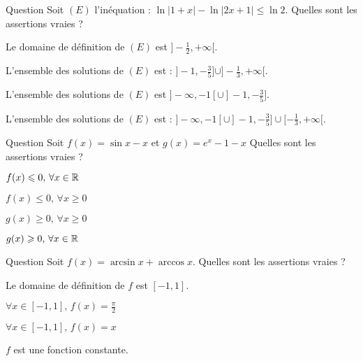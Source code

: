 \begin{multi}[multiple,feedback=
{Soit \(x \in \Rr \backslash \{-1, -\frac{1}{2}\}\). \((E) \Leftrightarrow \ln \vert \frac{x+1}{4x+2} \vert \le  0 \Leftrightarrow \, (E') : \, \vert \frac{x+1}{4x+2} \vert \le 1 \). 
Si \(x>-\frac{1}{2}\), \((E')\Leftrightarrow -4x-2 \le x+1\le 4x+2  \Leftrightarrow x \ge -\frac{1}{3}\).
Si  \(x<-\frac{1}{2}\), \((E')\Leftrightarrow -4x-2 \ge x+1 \ge 4x+2  \Leftrightarrow x \le -\frac{3}{5}\).
Par conséquent, l'ensemble des solutions de \((E)\) est \(]-\infty, -1[ \cup ]-1,-\frac{3}{5}] \cup [-\frac{1}{3}, + \infty[\). 
}]{Question}
Soit \((E)\) l'inéquation : \( \ln |1+x|-\ln |2x+1| \le \ln 2\). Quelles sont les assertions vraies ?

    \item Le domaine de définition de \((E)\) est  \(]-\frac{1}{2}, +\infty[\).
    \item L'ensemble des solutions de \((E)\) est : \( ]-1,-\frac{3}{5}] \cup ]-\frac{1}{3}, + \infty[\).
    \item L'ensemble des solutions de \((E)\) est \(]-\infty, -1[ \cup ]-1,-\frac{3}{5}]  \).
    \item* L'ensemble des solutions de \((E)\) est : \(]-\infty, -1[ \cup ]-1,-\frac{3}{5}] \cup [-\frac{1}{3}, + \infty[\).
\end{multi}


\begin{multi}[multiple,feedback=
{On pourra étudier les variations des fonctions \(f\) et \(g\). On obtient :  \(\sin x \le x, \, \forall x\ge 0\) et \(e^x \ge 1+x, \, \forall x\in \Rr\).
}]{Question}
Soit   \(f(x)= \sin x -x\) et \(g(x)= e^x-1-x\)  Quelles sont les assertions vraies ?

    \item \(f(x) \leqslant  0, \,  \forall x \in \mathbb{R}\)
    \item* \(f(x) \le  0, \,   \forall x\ge 0\)
    \item* \(g(x) \ge   0, \,   \forall x\ge 0\)
    \item* \(g(x) \geqslant   0, \,  \forall x \in \mathbb{R}\)
\end{multi}


\begin{multi}{Question}
Soit \(f(x)=\arcsin x + \arccos x\).  Quelles sont les assertions vraies ?

    \item* Le domaine de définition de \(f\) est \([-1,1]\).
    \item* \(\forall x\in [-1,1], \, f(x)=\frac{\pi}{2}\)
    \item \(\forall x\in [-1,1], \, f(x)= x\)
    \item* \(f\) est une fonction constante.
\end{multi}



